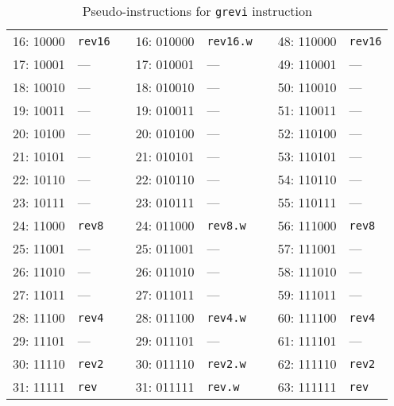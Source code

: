 \begin{table}[h]
\begin{small}
\begin{center}
\begin{tabular}{r l p{0.5in} r l p{0.3in} r l}
\cline{1-2}
\cline{4-5}
\cline{7-8}

16: 10000 & {\tt rev16}   &   & 16: 010000 & {\tt rev16.w} &   & 48: 110000 & {\tt rev16} \\
17: 10001 & ---           &   & 17: 010001 & ---           &   & 49: 110001 & ---         \\
18: 10010 & ---           &   & 18: 010010 & ---           &   & 50: 110010 & ---         \\
19: 10011 & ---           &   & 19: 010011 & ---           &   & 51: 110011 & ---         \\
20: 10100 & ---           &   & 20: 010100 & ---           &   & 52: 110100 & ---         \\
21: 10101 & ---           &   & 21: 010101 & ---           &   & 53: 110101 & ---         \\
22: 10110 & ---           &   & 22: 010110 & ---           &   & 54: 110110 & ---         \\
23: 10111 & ---           &   & 23: 010111 & ---           &   & 55: 110111 & ---         \\

\cline{1-2}
\cline{4-5}
\cline{7-8}

24: 11000 & {\tt rev8}    &   & 24: 011000 & {\tt rev8.w}  &   & 56: 111000 & {\tt rev8}  \\
25: 11001 & ---           &   & 25: 011001 & ---           &   & 57: 111001 & ---         \\
26: 11010 & ---           &   & 26: 011010 & ---           &   & 58: 111010 & ---         \\
27: 11011 & ---           &   & 27: 011011 & ---           &   & 59: 111011 & ---         \\
28: 11100 & {\tt rev4}    &   & 28: 011100 & {\tt rev4.w}  &   & 60: 111100 & {\tt rev4}  \\
29: 11101 & ---           &   & 29: 011101 & ---           &   & 61: 111101 & ---         \\
30: 11110 & {\tt rev2}    &   & 30: 011110 & {\tt rev2.w}  &   & 62: 111110 & {\tt rev2}  \\
31: 11111 & {\tt rev}     &   & 31: 011111 & {\tt rev.w}   &   & 63: 111111 & {\tt rev}   \\
\end{tabular}
\end{center}
\end{small}
\caption{Pseudo-instructions for {\tt grevi} instruction}
\label{grevi-modes}
\end{table}

